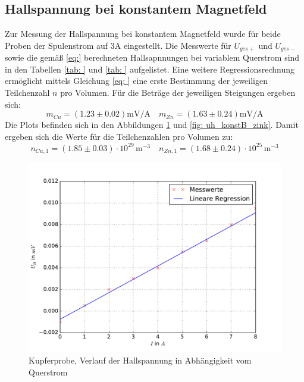 \subsection{Hallspannung bei konstantem Magnetfeld}
Zur Messung der Hallspannung bei konstantem Magnetfeld wurde für beide Proben der Spulenstrom auf $3\si{\ampere}$ eingestellt. Die
Messwerte für $U_{ges+}$ und $U_{ges-}$ sowie die gemäß \eqref{eq:} berechneten Hallsapnnungen bei variablem Querstrom sind in den
Tabellen \ref{tab: } und \ref{tab: } aufgelistet. Eine weitere Regressionsrechnung ermöglicht mittels Gleichung \eqref{eq: } eine
erste Bestimmung der jeweiligen Teilchenzahl $n$ pro Volumen. Für die Beträge der jeweiligen Steigungen ergeben sich:
\begin{equation}
  m_{Cu} = (1.23 \pm 0.02)\si{\milli \volt \per \ampere}  \quad m_{Zn} = (1.63 \pm 0.24)\si{\milli \volt \per \ampere}
\end{equation}
Die Plots befinden sich in den Abbildungen \ref{fig: uh_konstB_kupfer} und \ref{fig: uh_konstB_zink}.
Damit ergeben sich die Werte für die Teilchenzahlen pro Volumen zu:
\begin{equation}
  n_{Cu,1} = (1.85 \pm 0.03)\cdot 10^{29}\,\si{ \meter^{-3}} \quad n_{Zn,1} = (1.68\pm 0.24)\cdot 10^{25}\,\si{ \meter^{-3}}
\end{equation}


\begin{figure}
  \centering
  \includegraphics[width=\textwidth]{pics/u_h_kupfer_konstB.pdf}
  \caption{Kupferprobe, Verlauf der Hallspannung in Abhängigkeit vom Querstrom}
  \label{fig: uh_konstB_kupfer}
\end{figure}
